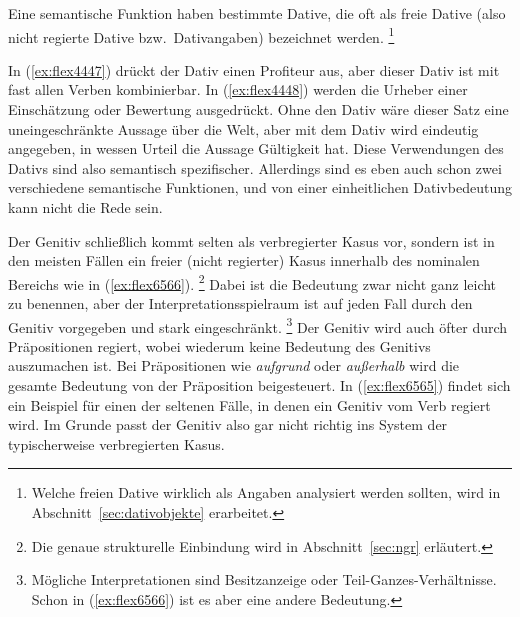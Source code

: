 
Eine semantische Funktion haben \zB bestimmte Dative, die oft als freie Dative (also nicht regierte Dative bzw.\ Dativangaben) bezeichnet werden.%
\footnote{Welche freien Dative wirklich als Angaben analysiert werden sollten, wird in Abschnitt~\ref{sec:dativobjekte} erarbeitet.}

\begin{exe}
  \ex \label{ex:flex4447}
  \begin{xlist}
  \end{xlist}
  \ex \label{ex:flex4448}
  \begin{xlist}
  \end{xlist}
\end{exe}

In (\ref{ex:flex4447}) drückt der Dativ einen Profiteur aus, aber dieser Dativ ist mit fast allen Verben kombinierbar.
In (\ref{ex:flex4448}) werden die Urheber einer Einschätzung oder Bewertung ausgedrückt.
Ohne den Dativ wäre dieser Satz eine uneingeschränkte Aussage über die Welt, aber mit dem Dativ wird eindeutig angegeben, in wessen Urteil die Aussage Gültigkeit hat.
Diese Verwendungen des Dativs sind also semantisch spezifischer.
Allerdings sind es eben auch schon zwei verschiedene semantische Funktionen, und von einer einheitlichen Dativbedeutung kann nicht die Rede sein.


Der Genitiv schließlich kommt selten als verbregierter Kasus vor, sondern ist in den meisten Fällen ein freier (nicht regierter) Kasus innerhalb des nominalen Bereichs wie in (\ref{ex:flex6566}).%
\footnote{Die genaue strukturelle Einbindung wird in Abschnitt~\ref{sec:ngr} erläutert.}
Dabei ist die Bedeutung zwar nicht ganz leicht zu benennen, aber der Interpretationsspielraum ist auf jeden Fall durch den Genitiv vorgegeben und stark eingeschränkt.%
\footnote{Mögliche Interpretationen sind Besitzanzeige oder Teil-Ganzes-Verhältnisse.
Schon in (\ref{ex:flex6566}) ist es aber eine andere Bedeutung.}
Der Genitiv wird auch öfter durch Präpositionen regiert, wobei wiederum keine Bedeutung des Genitivs auszumachen ist.
Bei Präpositionen wie \textit{aufgrund} oder \textit{außerhalb} wird die gesamte Bedeutung von der Präposition beigesteuert.
In (\ref{ex:flex6565}) findet sich ein Beispiel für einen der seltenen Fälle, in denen ein Genitiv vom Verb regiert wird.
Im Grunde passt der Genitiv also gar nicht richtig ins System der typischerweise verbregierten Kasus.

